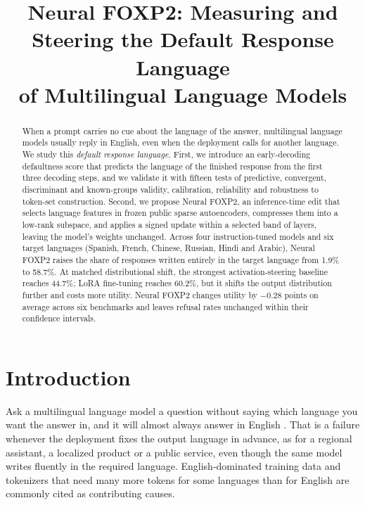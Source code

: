 \documentclass[11pt]{article}
\title{Neural FOXP2: Measuring and Steering the Default Response Language\\ of Multilingual Language Models}
\author{}
\newcommand{\foxp}{Neural FOXP2\xspace}
\begin{document}
\maketitle

\begin{abstract}
When a prompt carries no cue about the language of the answer, multilingual language models usually reply in English, even when the deployment calls for another language. We study this \emph{default response language}. First, we introduce an early-decoding defaultness score that predicts the language of the finished response from the first three decoding steps, and we validate it with fifteen tests of predictive, convergent, discriminant and known-groups validity, calibration, reliability and robustness to token-set construction. Second, we propose \foxp, an inference-time edit that selects language features in frozen public sparse autoencoders, compresses them into a low-rank subspace, and applies a signed update within a selected band of layers, leaving the model's weights unchanged. Across four instruction-tuned models and six target languages (Spanish, French, Chinese, Russian, Hindi and Arabic), \foxp raises the share of responses written entirely in the target language from 1.9\% to 58.7\%. At matched distributional shift, the strongest activation-steering baseline reaches 44.7\%; LoRA fine-tuning reaches 60.2\%, but it shifts the output distribution further and costs more utility. \foxp changes utility by $-0.28$ points on average across six benchmarks and leaves refusal rates unchanged within their confidence intervals.
\end{abstract}

\section{Introduction}
\label{sec:introduction}

Ask a multilingual language model a question without saying which language you want the answer in, and it will almost always answer in English \citep{marchisio-etal-2024-understanding,shani-basirat-2025-language}. That is a failure whenever the deployment fixes the output language in advance, as for a regional assistant, a localized product or a public service, even though the same model writes fluently in the required language. English-dominated training data and tokenizers that need many more tokens for some languages than for English \citep{petrov2023language} are commonly cited as contributing causes.
\end{document}

